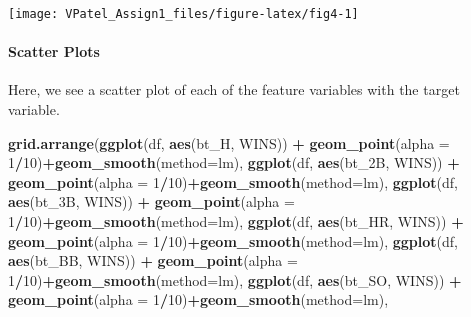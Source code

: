 \documentclass[]{article}
\newenvironment{Shaded}{\begin{snugshade}}{\end{snugshade}}
\newcommand{\DataTypeTok}[1]{\textcolor[rgb]{0.13,0.29,0.53}{#1}}
\newcommand{\DecValTok}[1]{\textcolor[rgb]{0.00,0.00,0.81}{#1}}
\newcommand{\KeywordTok}[1]{\textcolor[rgb]{0.13,0.29,0.53}{\textbf{#1}}}
\newcommand{\NormalTok}[1]{#1}
\newcommand{\OperatorTok}[1]{\textcolor[rgb]{0.81,0.36,0.00}{\textbf{#1}}}
\newcommand{\StringTok}[1]{\textcolor[rgb]{0.31,0.60,0.02}{#1}}
\let\oldparagraph\paragraph
\renewcommand{\paragraph}[1]{\oldparagraph{#1}\mbox{}}
\begin{document}
\begin{center}\texttt{[image: VPatel\_Assign1\_files/figure-latex/fig4-1]} \end{center}

\hypertarget{scatter-plots}{%
\paragraph{Scatter Plots}\label{scatter-plots}}

Here, we see a scatter plot of each of the feature variables with the
target variable.

\begin{Shaded}
\begin{Highlighting}[]
\KeywordTok{grid.arrange}\NormalTok{(}\KeywordTok{ggplot}\NormalTok{(df, }\KeywordTok{aes}\NormalTok{(bt_H, WINS)) }\OperatorTok{+}\StringTok{ }\KeywordTok{geom_point}\NormalTok{(}\DataTypeTok{alpha =} \DecValTok{1}\OperatorTok{/}\DecValTok{10}\NormalTok{)}\OperatorTok{+}\KeywordTok{geom_smooth}\NormalTok{(}\DataTypeTok{method=}\NormalTok{lm),}
             \KeywordTok{ggplot}\NormalTok{(df, }\KeywordTok{aes}\NormalTok{(bt_2B, WINS)) }\OperatorTok{+}\StringTok{ }\KeywordTok{geom_point}\NormalTok{(}\DataTypeTok{alpha =} \DecValTok{1}\OperatorTok{/}\DecValTok{10}\NormalTok{)}\OperatorTok{+}\KeywordTok{geom_smooth}\NormalTok{(}\DataTypeTok{method=}\NormalTok{lm),}
             \KeywordTok{ggplot}\NormalTok{(df, }\KeywordTok{aes}\NormalTok{(bt_3B, WINS)) }\OperatorTok{+}\StringTok{ }\KeywordTok{geom_point}\NormalTok{(}\DataTypeTok{alpha =} \DecValTok{1}\OperatorTok{/}\DecValTok{10}\NormalTok{)}\OperatorTok{+}\KeywordTok{geom_smooth}\NormalTok{(}\DataTypeTok{method=}\NormalTok{lm),}
             \KeywordTok{ggplot}\NormalTok{(df, }\KeywordTok{aes}\NormalTok{(bt_HR, WINS)) }\OperatorTok{+}\StringTok{ }\KeywordTok{geom_point}\NormalTok{(}\DataTypeTok{alpha =} \DecValTok{1}\OperatorTok{/}\DecValTok{10}\NormalTok{)}\OperatorTok{+}\KeywordTok{geom_smooth}\NormalTok{(}\DataTypeTok{method=}\NormalTok{lm),}
             \KeywordTok{ggplot}\NormalTok{(df, }\KeywordTok{aes}\NormalTok{(bt_BB, WINS)) }\OperatorTok{+}\StringTok{ }\KeywordTok{geom_point}\NormalTok{(}\DataTypeTok{alpha =} \DecValTok{1}\OperatorTok{/}\DecValTok{10}\NormalTok{)}\OperatorTok{+}\KeywordTok{geom_smooth}\NormalTok{(}\DataTypeTok{method=}\NormalTok{lm),}
             \KeywordTok{ggplot}\NormalTok{(df, }\KeywordTok{aes}\NormalTok{(bt_SO, WINS)) }\OperatorTok{+}\StringTok{ }\KeywordTok{geom_point}\NormalTok{(}\DataTypeTok{alpha =} \DecValTok{1}\OperatorTok{/}\DecValTok{10}\NormalTok{)}\OperatorTok{+}\KeywordTok{geom_smooth}\NormalTok{(}\DataTypeTok{method=}\NormalTok{lm),}

\end{Highlighting}
\end{Shaded}
\end{document}
